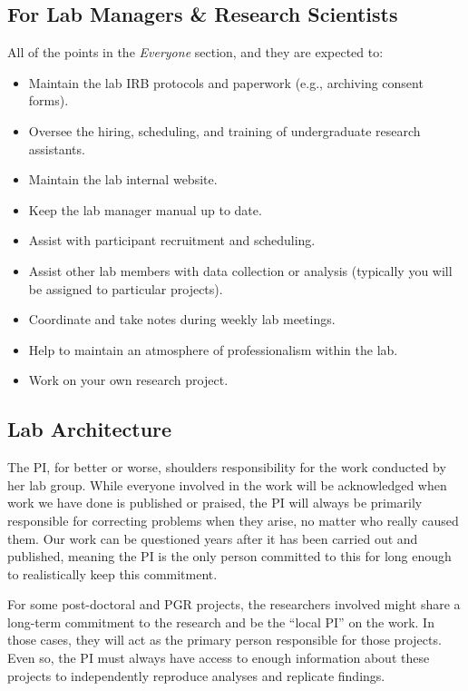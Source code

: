 \documentclass[
]{book}
\providecommand{\tightlist}{%
  \setlength{\itemsep}{0pt}\setlength{\parskip}{0pt}}
\begin{document}
\hypertarget{for-lab-managers-research-scientists}{%
\subsection{For Lab Managers \& Research Scientists}\label{for-lab-managers-research-scientists}}

All of the points in the \emph{Everyone} section, and they are expected to:

\begin{itemize}
\tightlist
\item
  Maintain the lab IRB protocols and paperwork (e.g., archiving consent forms).
\item
  Oversee the hiring, scheduling, and training of undergraduate research assistants.
\item
  Maintain the lab internal website.
\item
  Keep the lab manager manual up to date.
\item
  Assist with participant recruitment and scheduling.
\item
  Assist other lab members with data collection or analysis (typically you will be assigned to particular projects).
\item
  Coordinate and take notes during weekly lab meetings.
\item
  Help to maintain an atmosphere of professionalism within the lab.
\item
  Work on your own research project.
\end{itemize}

\hypertarget{lab-architecture}{%
\subsection{Lab Architecture}\label{lab-architecture}}

The PI, for better or worse, shoulders responsibility for the work conducted by her lab group. While everyone involved in the work will be acknowledged when work we have done is published or praised, the PI will always be primarily responsible for correcting problems when they arise, no matter who really caused them. Our work can be questioned years after it has been carried out and published, meaning the PI is the only person committed to this for long enough to realistically keep this commitment.

For some post-doctoral and PGR projects, the researchers involved might share a long-term commitment to the research and be the ``local PI'' on the work. In those cases, they will act as the primary person responsible for those projects. Even so, the PI must always have access to enough information about these projects to independently reproduce analyses and replicate findings.
\end{document}
